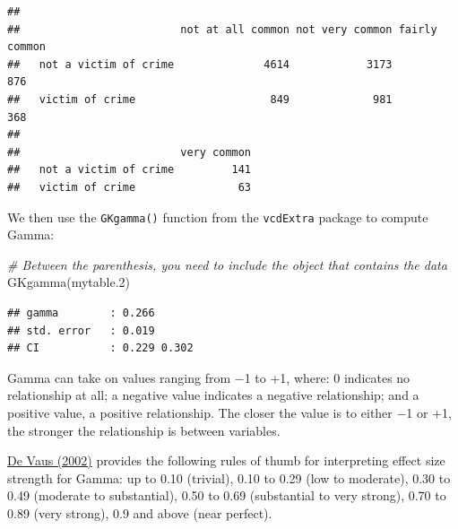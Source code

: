 \documentclass[
]{book}
\newenvironment{Shaded}{\begin{snugshade}}{\end{snugshade}}
\newcommand{\CommentTok}[1]{\textcolor[rgb]{0.56,0.35,0.01}{\textit{#1}}}
\newcommand{\FloatTok}[1]{\textcolor[rgb]{0.00,0.00,0.81}{#1}}
\newcommand{\FunctionTok}[1]{\textcolor[rgb]{0.00,0.00,0.00}{#1}}
\newcommand{\NormalTok}[1]{#1}
\newcommand{\OtherTok}[1]{\textcolor[rgb]{0.56,0.35,0.01}{#1}}
\newcommand{\SpecialCharTok}[1]{\textcolor[rgb]{0.00,0.00,0.00}{#1}}
\begin{document}
\begin{Shaded}
\end{Shaded}

\begin{verbatim}
##                        
##                         not at all common not very common fairly common
##   not a victim of crime              4614            3173           876
##   victim of crime                     849             981           368
##                        
##                         very common
##   not a victim of crime         141
##   victim of crime                63
\end{verbatim}

We then use the \texttt{GKgamma()} function from the \texttt{vcdExtra} package to compute Gamma:

\begin{Shaded}
\begin{Highlighting}[]
\CommentTok{\# Between the parenthesis, you need to include the object that contains the data}
\FunctionTok{GKgamma}\NormalTok{(mytable}\FloatTok{.2}\NormalTok{) }
\end{Highlighting}
\end{Shaded}

\begin{verbatim}
## gamma        : 0.266 
## std. error   : 0.019 
## CI           : 0.229 0.302
\end{verbatim}

Gamma can take on values ranging from −1 to +1, where: 0 indicates no relationship at all; a negative value indicates a negative relationship; and a positive value, a positive relationship. The closer the value is to either −1 or +1, the stronger the relationship is between variables.

\href{https://www.taylorfrancis.com/books/mono/10.4324/9780203501054/surveys-social-research-david-de-vaus}{De Vaus (2002)} provides the following rules of thumb for interpreting effect size strength for Gamma: up to 0.10 (trivial), 0.10 to 0.29 (low to moderate), 0.30 to 0.49 (moderate to substantial), 0.50 to 0.69 (substantial to very strong), 0.70 to 0.89 (very strong), 0.9 and above (near perfect).
\end{document}
